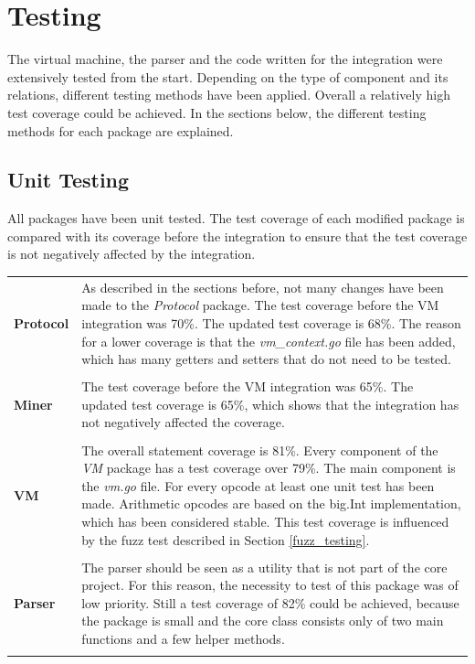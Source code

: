 \section{Testing}
The virtual machine, the parser and the code written for the integration were extensively tested from the start. Depending on the type of component and its relations, different testing methods have been applied. Overall a relatively high test coverage could be achieved. In the sections below, the different testing methods for each package are explained.

\subsection{Unit Testing}
All packages have been unit tested. The test coverage of each modified package is compared with its coverage before the integration to ensure that the test coverage is not negatively affected by the integration.

\begin{tabular}[t]{ p{3cm} p{12.5cm}}
\raggedright
\textbf{Protocol} &
As described in the sections before, not many changes have been made to the \textit{Protocol} package. The test coverage before the VM integration was 70\%. The updated test coverage is 68\%. The reason for a lower coverage is that the \textit{vm\_context.go} file has been added, which has many getters and setters that do not need to be tested. \\ \\
\textbf{Miner} &
The test coverage before the VM integration was 65\%. The updated test coverage is 65\%, which shows that the integration has not negatively affected the coverage. \\ \\
\textbf{VM} &
The overall statement coverage is 81\%. Every component of the \textit{VM} package has a test coverage over 79\%. The main component is the \textit{vm.go} file. For every opcode at least one unit test has been made. Arithmetic opcodes are based on the big.Int implementation, which has been considered stable. This test coverage is influenced by the fuzz test described in Section \ref{fuzz_testing}. \\ \\
\textbf{Parser} &
The parser should be seen as a utility that is not part of the core project. For this reason, the necessity to test of this package was of low priority. Still a test coverage of 82\% could be achieved, because the package is small and the core class consists only of two main functions and a few helper methods. \\ \\
\end{tabular}

